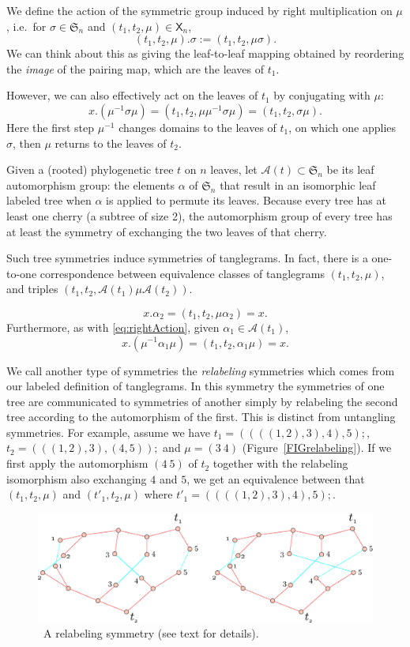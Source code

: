 \documentclass{amsart}
\newcommand{\fS}{\mathfrak S}
\newcommand{\aut}{\mathcal A}
\newcommand{\pairing}{\mu}
\newcommand{\tangle}{\mathsf{X}}
\newcommand{\arxiv}[1]{#1}
\newcommand{\FIGrelabeling}{\
\label{FIGrelabeling}
\begin{figure}
  \arxiv{\includegraphics[width=5in]{figures/relabeling-example}}
\caption{\
  A relabeling symmetry (see text for details).
}
\end{figure}
}
\begin{document}
We define the action of the symmetric group induced by right multiplication on $\pairing$, i.e.\ for $\sigma \in \fS_n$ and $(t_1, t_2, \pairing) \in \tangle_n$,
\[
(t_1, t_2, \pairing) . \sigma := (t_1, t_2, \pairing \sigma).
\]
We can think about this as giving the leaf-to-leaf mapping obtained by reordering the \emph{image} of the pairing map, which are the leaves of $t_1$.

However, we can also effectively act on the leaves of $t_1$ by conjugating with $\pairing$:
\begin{equation}
\label{eq:rightAction}
x . (\pairing^{-1} \sigma \pairing)
= (t_1, t_2, \pairing \pairing^{-1} \sigma \pairing)
= (t_1, t_2, \sigma \pairing).
\end{equation}
Here the first step $\pairing^{-1}$ changes domains to the leaves of $t_1$, on which one applies $\sigma$, then $\pairing$ returns to the leaves of $t_2$.

Given a (rooted) phylogenetic tree $t$ on $n$ leaves, let $\aut(t) \subset \fS_n$ be its leaf automorphism group: the elements $\alpha$ of $\fS_n$ that result in an isomorphic leaf labeled tree when $\alpha$ is applied to permute its leaves.
Because every tree has at least one cherry (a subtree of size 2), the automorphism group of every tree has at least the symmetry of exchanging the two leaves of that cherry.

Such tree symmetries induce symmetries of tanglegrams.
In fact, there is a one-to-one correspondence between equivalence classes of tanglegrams $(t_1, t_2, \pairing)$, and triples $(t_1, t_2, \aut(t_1) \pairing \aut(t_2))$.

\[
x . \alpha_2 = (t_1, t_2, \pairing \alpha_2) = x.
\]
Furthermore, as with \eqref{eq:rightAction}, given $\alpha_1 \in \aut(t_1)$,
\[
x . (\pairing^{-1} \alpha_1 \pairing) = (t_1, t_2, \alpha_1 \pairing) = x.
\]

We call another type of symmetries the \emph{relabeling} symmetries which comes from our labeled definition of tanglegrams.
In this symmetry the symmetries of one tree are communicated to symmetries of another simply by relabeling the second tree according to the automorphism of the first.
This is distinct from untangling symmetries.
For example, assume we have $t_1 = ((((1,2),3),4),5);$, $t_2 = (((1,2),3),(4,5));$ and $\mu = (3\ 4)$ (Figure~\ref{FIGrelabeling}).
If we first apply the automorphism $(4\ 5)$ of $t_2$ together with the relabeling isomorphism also exchanging $4$ and $5$, we get an equivalence between that $(t_1,t_2,\pairing)$ and $(t'_1,t_2,\pairing)$ where $t'_1 = ((((1,2),3),4),5);$.
\FIGrelabeling
\end{document}
